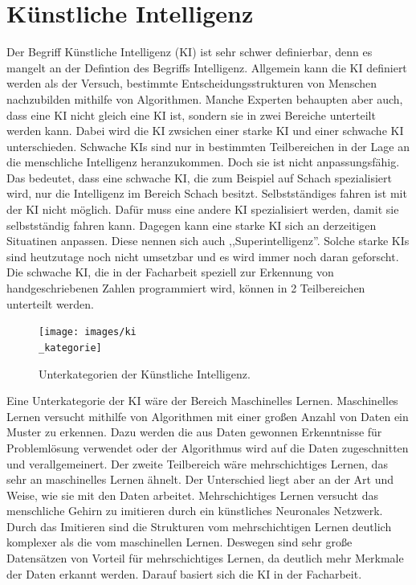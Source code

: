 \documentclass[11pt]{article}
\begin{document}
\section{Künstliche Intelligenz}
Der Begriff Künstliche Intelligenz (KI) ist sehr schwer definierbar, denn es mangelt an der Defintion des Begriffs Intelligenz.
Allgemein kann die KI definiert werden als der Versuch, bestimmte Entscheidungsstrukturen von Menschen nachzubilden mithilfe von
Algorithmen. Manche Experten behaupten aber auch, dass eine KI nicht gleich eine KI ist, sondern sie in zwei Bereiche unterteilt werden kann.
Dabei wird die KI zwsichen einer starke KI und einer schwache KI unterschieden. Schwache KIs sind nur in bestimmten Teilbereichen in der Lage
an die menschliche Intelligenz heranzukommen. Doch sie ist nicht anpassungsfähig. Das bedeutet, dass eine schwache KI, die zum Beispiel auf Schach
spezialisiert wird, nur die Intelligenz im Bereich Schach besitzt. Selbstständiges fahren ist mit der KI nicht möglich. Dafür muss eine
andere KI spezialisiert werden, damit sie selbstständig fahren kann. Dagegen kann eine starke KI sich an derzeitigen Situatinen anpassen. Diese nennen sich auch ,,Superintelligenz''.
Solche starke KIs sind heutzutage noch nicht umsetzbar und es wird immer noch daran geforscht.
Die schwache KI, die in der Facharbeit speziell zur Erkennung von handgeschriebenen Zahlen programmiert wird, können in 2 Teilbereichen
unterteilt werden.
\begin{figure}[h]
    \centering
    \texttt{[image: images/ki\\\_kategorie]}
    \caption{Unterkategorien der Künstliche Intelligenz.}
\end{figure}
Eine Unterkategorie der KI wäre der Bereich Maschinelles Lernen. Maschinelles Lernen versucht mithilfe von Algorithmen mit einer großen Anzahl von
Daten ein Muster zu erkennen. Dazu werden die aus Daten gewonnen Erkenntnisse für Problemlösung verwendet oder der Algorithmus wird auf
die Daten zugeschnitten und verallgemeinert.
Der zweite Teilbereich wäre mehrschichtiges Lernen, das sehr an maschinelles Lernen ähnelt. Der Unterschied liegt aber an der Art und Weise, wie
sie mit den Daten arbeitet. Mehrschichtiges Lernen versucht das menschliche Gehirn zu imitieren durch ein künstliches Neuronales Netzwerk.
Durch das Imitieren sind die Strukturen vom mehrschichtigen Lernen deutlich komplexer als die vom maschinellen Lernen. Deswegen sind
sehr große Datensätzen von Vorteil für mehrschichtiges Lernen, da deutlich mehr Merkmale der Daten erkannt werden. Darauf basiert sich die KI
in der Facharbeit.
\end{document}
